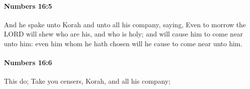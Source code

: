 		\paragraph{Numbers 16:5} %
			\label{NUMBERS-16-5}

			And he spake unto Korah and unto all his company, saying, Even to morrow the LORD will shew who are his, and who is holy; and will cause him to come near unto him: even him whom he hath chosen will he cause to come near unto him.


		\paragraph{Numbers 16:6} %
			\label{NUMBERS-16-6}

			This do; Take you censers, Korah, and all his company;


